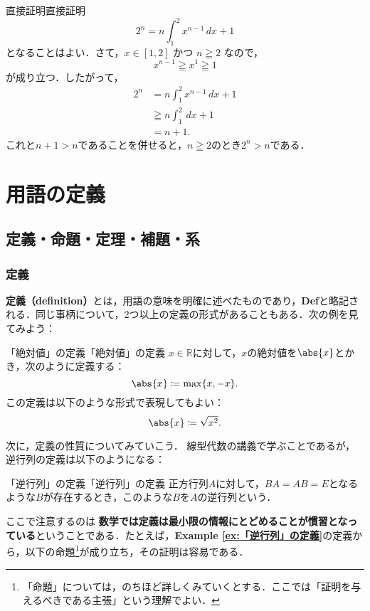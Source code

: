 \documentclass[a4paper,11pt]{ltjsarticle}
\renewcommand{\emph}[1]{\textbf{#1}}
\newcommand{\exref}[1]{{\bfseries\sffamily Example \ref{ex:#1}}}
\begin{document}
      \begin{example}{直接証明}{直接証明}
        \[
        2^n = n \int_{1}^{2} x^{n-1} \, dx + 1 
        \]
        となることはよい．さて，$x \in [1, 2]$ かつ $n \geqq 2$ なので，
        \[
        x^{n-1} \geqq x^{1} \geqq 1
        \]
        が成り立つ．したがって，
        \begin{align*}
        2^n &= n \int_{1}^{2} x^{n-1} \, dx + 1 \\
        & \geqq  n \int_{1}^{2} \, dx +1 \\
        & = n+1.
        \end{align*}
        これと$n+1 >n$であることを併せると，$n \geqq 2$のとき$2^n > n$である．
      \end{example}


\section{用語の定義}

\subsection{定義・命題・定理・補題・系}

\subsubsection{定義}

\emph{定義（definition）}とは，用語の意味を明確に述べたものであり，\textbf{Def}と略記される．同じ事柄について，2つ以上の定義の形式があることもある．次の例を見てみよう：

\begin{example}{「絶対値」の定義}{「絶対値」の定義}
	$ x \in \mathbb{R}$に対して，$x$の絶対値を$\abs{x}$とかき，次のように定義する：
	\[
	\abs{x} \coloneqq \max \{ x , -x \} .
	\]
	この定義は以下のような形式で表現してもよい：
	\[
	\abs{x} \coloneqq  \sqrt{x^2}.
	\]
\end{example}

次に，定義の性質についてみていこう．
線型代数の講義で学ぶことであるが，逆行列の定義は以下のようになる：

\begin{example}{「逆行列」の定義}{「逆行列」の定義}
	正方行列$A$に対して，$BA = AB =E$となるような$B$が存在するとき，このような$B$を$A$の逆行列という．
\end{example}


ここで注意するのは \emph{数学では定義は最小限の情報にとどめることが慣習となっている}ということである．たとえば，\exref{「逆行列」の定義}の定義から，以下の命題\footnote{「命題」については，のちほど詳しくみていくとする．ここでは「証明を与えるべきである主張」という理解でよい．}が成り立ち，その証明は容易である．
\end{document}
